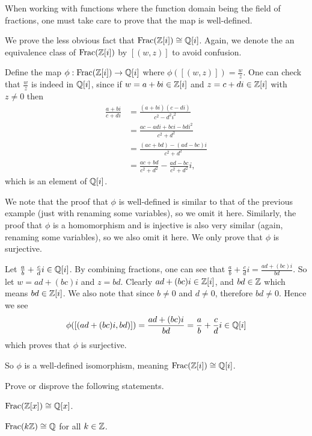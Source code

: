 \begin{remark}
    When working with functions where the function domain being the field of fractions, one must take care to prove that the map is well-defined.
\end{remark}

\begin{example}\label{example-field-of-fractions-of-gaussian-integers-isomorphic-to-quadratic-integers-of-i}
    We prove the less obvious fact that $\mathrm{Frac}(\mathbb{Z}[i]) \cong \mathbb{Q}[i]$. Again, we denote the an equivalence class of $\mathrm{Frac}(\mathbb{Z}[i])$ by $[(w, z)]$ to avoid confusion.

    Define the map $\phi: \mathrm{Frac}(\mathbb{Z}[i]) \to \mathbb{Q}[i]$ where $\phi([(w, z)]) = \frac wz$. One can check that $\frac wz$ is indeed in $\mathbb{Q}[i]$, since if $w = a+bi\in\mathbb{Z}[i]$ and $z = c+di \in \mathbb{Z}[i]$ with $z \neq 0$ then
    \begin{align*}
        \frac{a+bi}{c+di} &= \frac{(a+bi)(c-di)}{c^2 - d^2i^2}\\
        &= \frac{ac-adi+bci-bdi^2}{c^2+d^2}\\
        &= \frac{(ac+bd) - (ad-bc)i}{c^2+d^2}\\
        &= \frac{ac+bd}{c^2+d^2} - \frac{ad-bc}{c^2+d^2}i,
    \end{align*}
    which is an element of $\mathbb{Q}[i]$.

    We note that the proof that $\phi$ is well-defined is similar to that of the previous example (just with renaming some variables), so we omit it here. Similarly, the proof that $\phi$ is a homomorphism and is injective is also very similar (again, renaming some variables), so we also omit it here. We only prove that $\phi$ is surjective.

    Let $\frac ab + \frac cd i \in \mathbb{Q}[i]$. By combining fractions, one can see that $\frac ab + \frac cd i = \frac{ad+(bc)i}{bd}$. So let $w = ad + (bc)i$ and $z = bd$. Clearly $ad + (bc)i \in \mathbb{Z}[i]$, and $bd \in \mathbb{Z}$ which means $bd \in \mathbb{Z}[i]$. We also note that since $b\neq 0$ and $d \neq 0$, therefore $bd \neq 0$. Hence we see
    \[
        \phi([(ad+(bc)i, bd)]) = \frac{ad+(bc)i}{bd} = \frac ab + \frac cd i \in \mathbb{Q}[i]
    \]
    which proves that $\phi$ is surjective.

    So $\phi$ is a well-defined isomorphism, meaning $\mathrm{Frac}(\mathbb{Z}[i]) \cong \mathbb{Q}[i]$.
\end{example}

\begin{exercise}
    Prove or disprove the following statements.
    \begin{partquestions}{\alph*}
        \item $\mathrm{Frac}(\mathbb{Z}[x]) \cong \mathbb{Q}[x]$.
        \item $\mathrm{Frac}(k\mathbb{Z}) \cong \mathbb{Q}$ for all $k \in \mathbb{Z}$.
    \end{partquestions}
\end{exercise}

